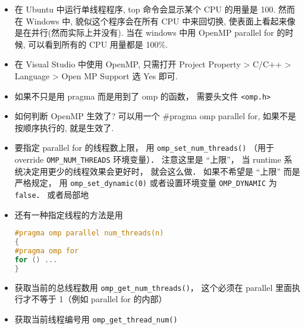 
\begin{issues}
\issueDraft
\end{issues}


\begin{itemize}
\item 在 Ubuntu 中运行单线程程序, top 命令会显示某个 CPU 的用量是 100. 然而在 Windows 中, 貌似这个程序会在所有 CPU 中来回切换, 使表面上看起来像是在并行(然而实际上并没有). 当在 windows 中用 OpenMP parallel for 的时候, 可以看到所有的 CPU 用量都是 100\%.
\item 在 Visual Studio 中使用 OpenMP, 只需打开 Project Property > C/C++ > Language > Open MP Support 选 Yes 即可.
\item 如果不只是用 pragma 而是用到了 omp 的函数， 需要头文件 \verb`<omp.h>`
\item 如何判断 OpenMP 生效了? 可以用一个 #pragma omp parallel for, 如果不是按顺序执行的, 就是生效了.

\item 要指定 parallel for 的线程数上限， 用 \verb`omp_set_num_threads()` （用于 override \verb`OMP_NUM_THREADS` 环境变量）． 注意这里是 “上限”， 当 runtime 系统决定用更少的线程效果会更好时， 就会这么做． 如果不希望是 “上限” 而是严格规定， 用 \verb`omp_set_dynamic(0)` 或者设置环境变量 \verb`OMP_DYNAMIC` 为 \verb`false`．
 或者局部地
\item 还有一种指定线程的方法是用
\begin{lstlisting}[language=cpp]
#pragma omp parallel num_threads(n)
{
#pragma omp for
for () ...
}
\end{lstlisting}
\item 获取当前的总线程数用 \verb`omp_get_num_threads()`， 这个必须在 parallel 里面执行才不等于 1（例如 parallel for 的内部）
\item 获取当前线程编号用 \verb`omp_get_thread_num()`


\end{itemize}
